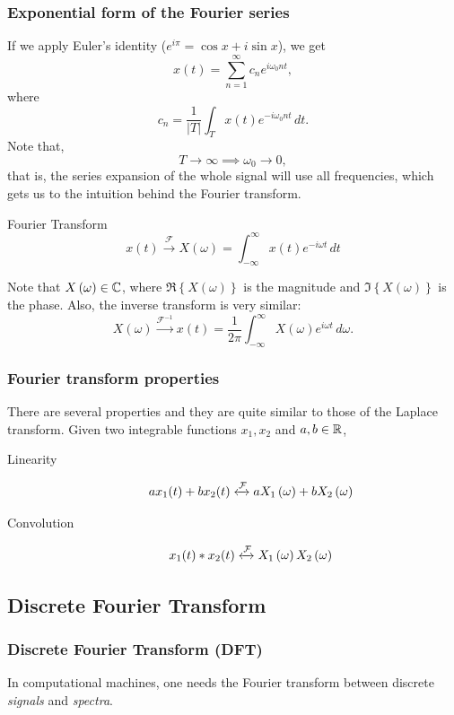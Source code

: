 \documentclass{beamer}
\begin{document}
\begin{frame}
    \frametitle{Exponential form of the Fourier series}
    If we apply Euler's identity ($e^{i \pi} = \cos x + i \sin x$), we get \[
    x(t) = \sum_{n=1}^{\infty} c_n e^{i \omega_0 n t}
    ,\] where \[
    c_n = \frac{1}{|T|} \int_T x(t) e^{-i\omega_0 n t} \,dt
    .\] Note that, \[
	T\to \infty \implies \omega_0 \to 0
    ,\] that is, the series expansion of the whole signal will use all frequencies, which gets us to the intuition behind the Fourier transform.
\end{frame}

\begin{frame}
    \begin{exampleblock}{Fourier Transform}
     \[
    x(t) \xrightarrow{\mathcal{F}} X\left( \omega \right) = \int_{-\infty}^{\infty} x(t) e^{-i\omega t} \,dt
    \]
    \end{exampleblock}
     Note that $X\left( \omega \right) \in \mathbb{C}$, where $\Re\left\{ X\left( \omega \right)  \right\} $ is the magnitude and $\Im\left\{ X\left( \omega \right)  \right\} $ is the phase.
    Also, the inverse transform is very similar: \[
    X(\omega) \xrightarrow{\mathcal{F}^{-1}} x\left( t \right) = \frac{1}{2\pi}\int_{-\infty}^{\infty} X\left( \omega \right)  e^{i\omega t} \,d\omega
    .\] 
\end{frame}

\begin{frame}
    \frametitle{Fourier transform properties}
    There are several properties and they are quite similar to those of the Laplace transform. Given two integrable functions $x_1,x_2$ and $a,b \in \mathbb{R}$,
    \begin{description}
        \item[Linearity] \[
		a x_1(t) + bx_2(t) \xleftrightarrow{\mathcal{F}} aX_1\left( \omega \right) + bX_2\left( \omega \right) 
       \] 
       \item[Convolution] \[
	       x_1(t) * x_2(t)\xleftrightarrow{\mathcal{F}} X_1\left( \omega \right) X_2\left( \omega \right) 
       \] 
    \end{description}
\end{frame}

\subsection{Discrete Fourier Transform}

\begin{frame}
    \frametitle{Discrete Fourier Transform (DFT)}
    In computational machines, one needs the Fourier transform between discrete \emph{signals} and \emph{spectra}.
\end{frame}
\end{document}
